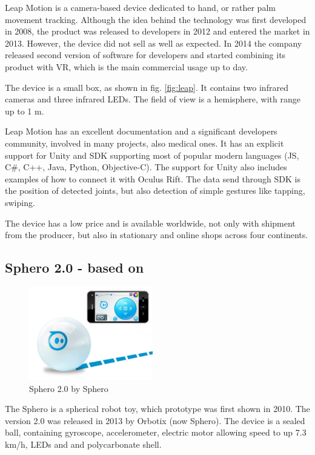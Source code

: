 Leap Motion is a camera-based device dedicated to hand, or rather palm movement tracking. Although the idea behind the technology was first developed in 2008, the product was released to developers in 2012 and entered the market in 2013. However, the device did not sell as well as expected. In 2014 the company released second version of software for developers and started combining its product with VR, which is the main commercial usage up to day.

The device is a small box, as shown in fig. \ref{fig:leap}. It contains two infrared cameras and three infrared LEDs. The field of view is a hemisphere, with range up to 1 m. 

Leap Motion has an excellent documentation and a significant developers community, involved in many projects, also medical ones. It has an explicit support for Unity and SDK supporting most of popular modern languages (JS, C\#, C++, Java, Python, Objective-C). The support for Unity also includes examples of how to connect it with Oculus Rift. The data send through SDK is the position of detected joints, but also detection of simple gestures like tapping, swiping.

The device has a low price and is available worldwide, not only with shipment from the producer, but also in stationary and online shops across four continents. 


\subsection{Sphero 2.0 - based on \cite{sphero, sphero_review}}

\begin{figure}
\includegraphics[width=0.48\textwidth]{graphics/sphero.jpg} 
\vspace{-8pt}
\caption{Sphero 2.0 by Sphero}
\label{fig:sphero}
\end{figure}

The Sphero is a spherical robot toy, which prototype was first shown in 2010. The version 2.0 was released in 2013 by Orbotix (now Sphero). The device is a sealed ball, containing gyroscope, accelerometer, electric motor allowing  speed to up 7.3 km/h, LEDs and and polycarbonate shell. 


